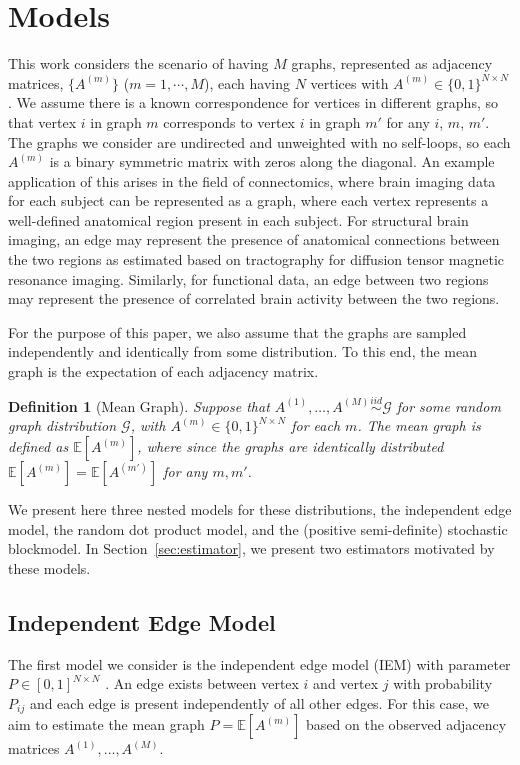 \documentclass[10pt,letterpaper]{article}
\newtheorem{definition}[fact]{Definition}
\newcommand{\Ex}{\mathbb{E}}
\begin{document}
\section{Models}
\label{section:model}
This work considers the scenario of having $M$ graphs, represented as adjacency matrices, $\{A^{(m)}\}$ ($m = 1, \cdots, M$), each having $N$ vertices with $A^{(m)}\in\{0,1\}^{N\times N}$.
We assume there is a known correspondence for vertices in different graphs, so that vertex $i$ in graph $m$ corresponds to vertex $i$ in graph $m'$ for any $i$, $m$, $m'$.
The graphs we consider are undirected and unweighted with no self-loops, so each $A^{(m)}$ is a binary symmetric matrix with zeros along the diagonal. An example application of this arises in the field of connectomics, where  brain imaging data for each subject can be represented as a graph, where each vertex represents a well-defined anatomical region present in each subject.
For structural brain imaging, an edge may represent the presence of anatomical connections between the two regions as estimated based on tractography for diffusion tensor magnetic resonance imaging.
Similarly, for functional data, an edge between two regions may represent the presence of correlated brain activity between the two regions. 


For the purpose of this paper, we also assume that the graphs are sampled independently and identically from some distribution.
To this end, the mean graph is the expectation of each adjacency matrix.
\begin{definition}[Mean Graph]
Suppose that $A^{(1)},\dotsc,A^{(M)}\stackrel{iid}{\sim} \mathcal{G}$ for some random graph distribution $\mathcal{G}$, with $A^{(m)}\in\{0,1\}^{N\times N}$ for each $m$.
The {\em mean graph} is defined as $\Ex[A^{(m)}]$, where since the graphs are identically distributed $\Ex[A^{(m)}]=\Ex[A^{(m')}]$ for any $m,m'$.
\end{definition}

We present here three nested models for these distributions, the independent edge model, the random dot product model, and the (positive semi-definite) stochastic blockmodel.
In Section~\ref{sec:estimator}, we present two estimators motivated by these models.



\subsection{Independent Edge Model}
The first model we consider is the independent edge model (IEM) with parameter $P \in [0,1]^{N\times N}$ \citep{bollobas2007phase}.
An edge exists between vertex $i$ and vertex $j$ with probability $P_{ij}$ and each edge is present independently of all other edges. 
For this case, we aim to estimate the mean graph $P=\Ex[A^{(m)}]$ based on the observed adjacency matrices $A^{(1)},\dotsc,A^{(M)}$.
\end{document}
